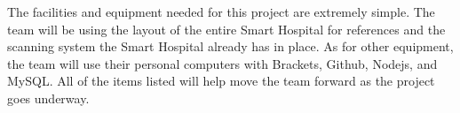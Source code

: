 
The facilities and equipment needed for this project are extremely simple. The team will be using the layout of the entire Smart Hospital for references and the scanning system the Smart Hospital already has in place. As for other equipment, the team will use their personal computers with Brackets, Github, Nodejs, and MySQL. All of the items listed will help move the team forward as the project goes underway.